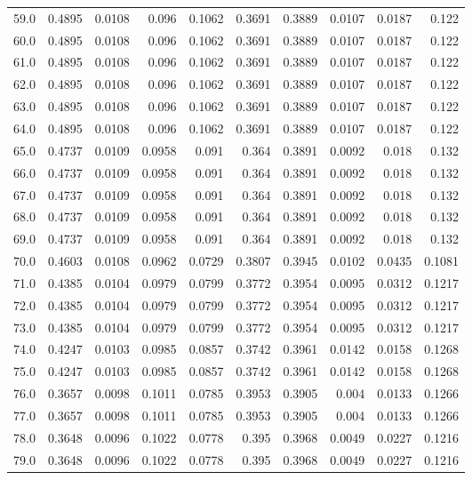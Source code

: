 \begin{longtable}{lrrrrrrrrr}
59.0 & 0.4895 & 0.0108 & 0.096 & 0.1062 & 0.3691 & 0.3889 & 0.0107 & 0.0187 & 0.122 \\
60.0 & 0.4895 & 0.0108 & 0.096 & 0.1062 & 0.3691 & 0.3889 & 0.0107 & 0.0187 & 0.122 \\
61.0 & 0.4895 & 0.0108 & 0.096 & 0.1062 & 0.3691 & 0.3889 & 0.0107 & 0.0187 & 0.122 \\
62.0 & 0.4895 & 0.0108 & 0.096 & 0.1062 & 0.3691 & 0.3889 & 0.0107 & 0.0187 & 0.122 \\
63.0 & 0.4895 & 0.0108 & 0.096 & 0.1062 & 0.3691 & 0.3889 & 0.0107 & 0.0187 & 0.122 \\
64.0 & 0.4895 & 0.0108 & 0.096 & 0.1062 & 0.3691 & 0.3889 & 0.0107 & 0.0187 & 0.122 \\
65.0 & 0.4737 & 0.0109 & 0.0958 & 0.091 & 0.364 & 0.3891 & 0.0092 & 0.018 & 0.132 \\
66.0 & 0.4737 & 0.0109 & 0.0958 & 0.091 & 0.364 & 0.3891 & 0.0092 & 0.018 & 0.132 \\
67.0 & 0.4737 & 0.0109 & 0.0958 & 0.091 & 0.364 & 0.3891 & 0.0092 & 0.018 & 0.132 \\
68.0 & 0.4737 & 0.0109 & 0.0958 & 0.091 & 0.364 & 0.3891 & 0.0092 & 0.018 & 0.132 \\
69.0 & 0.4737 & 0.0109 & 0.0958 & 0.091 & 0.364 & 0.3891 & 0.0092 & 0.018 & 0.132 \\
70.0 & 0.4603 & 0.0108 & 0.0962 & 0.0729 & 0.3807 & 0.3945 & 0.0102 & 0.0435 & 0.1081 \\
71.0 & 0.4385 & 0.0104 & 0.0979 & 0.0799 & 0.3772 & 0.3954 & 0.0095 & 0.0312 & 0.1217 \\
72.0 & 0.4385 & 0.0104 & 0.0979 & 0.0799 & 0.3772 & 0.3954 & 0.0095 & 0.0312 & 0.1217 \\
73.0 & 0.4385 & 0.0104 & 0.0979 & 0.0799 & 0.3772 & 0.3954 & 0.0095 & 0.0312 & 0.1217 \\
74.0 & 0.4247 & 0.0103 & 0.0985 & 0.0857 & 0.3742 & 0.3961 & 0.0142 & 0.0158 & 0.1268 \\
75.0 & 0.4247 & 0.0103 & 0.0985 & 0.0857 & 0.3742 & 0.3961 & 0.0142 & 0.0158 & 0.1268 \\
76.0 & 0.3657 & 0.0098 & 0.1011 & 0.0785 & 0.3953 & 0.3905 & 0.004 & 0.0133 & 0.1266 \\
77.0 & 0.3657 & 0.0098 & 0.1011 & 0.0785 & 0.3953 & 0.3905 & 0.004 & 0.0133 & 0.1266 \\
78.0 & 0.3648 & 0.0096 & 0.1022 & 0.0778 & 0.395 & 0.3968 & 0.0049 & 0.0227 & 0.1216 \\
79.0 & 0.3648 & 0.0096 & 0.1022 & 0.0778 & 0.395 & 0.3968 & 0.0049 & 0.0227 & 0.1216 \\

\end{longtable}
